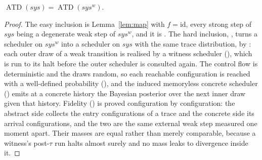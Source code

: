 \begin{theorem}
  \label{thm:weakclosure-eq}
  \leanok
  $\operatorname{ATD}(sys) = \operatorname{ATD}(sys^w)$.
\end{theorem}

\begin{proof}\leanok
  The easy inclusion is Lemma~\ref{lem:map} with $f = \mathrm{id}$, every strong step of $sys$ being a degenerate weak step of $sys^w$, and it is .
  The hard inclusion, , turns a scheduler on $sys^w$ into a scheduler on $sys$ with the same trace distribution, by : each outer draw of a weak transition is realised by a witness scheduler (), which is run to its halt before the outer scheduler is consulted again.
  The control flow is deterministic and the draws random, so each reachable configuration is reached with a well-defined probability (), and the induced memoryless concrete scheduler () emits at a concrete history the Bayesian posterior over the next inner draw given that history.
  Fidelity () is proved configuration by configuration: the abstract side collects the entry configurations of a trace and the concrete side its arrival configurations, and the two are the same external weak step measured one moment apart.
  Their masses are equal rather than merely comparable, because a witness's post-$\tau$ run halts almost surely and no mass leaks to divergence inside it.
\end{proof}
